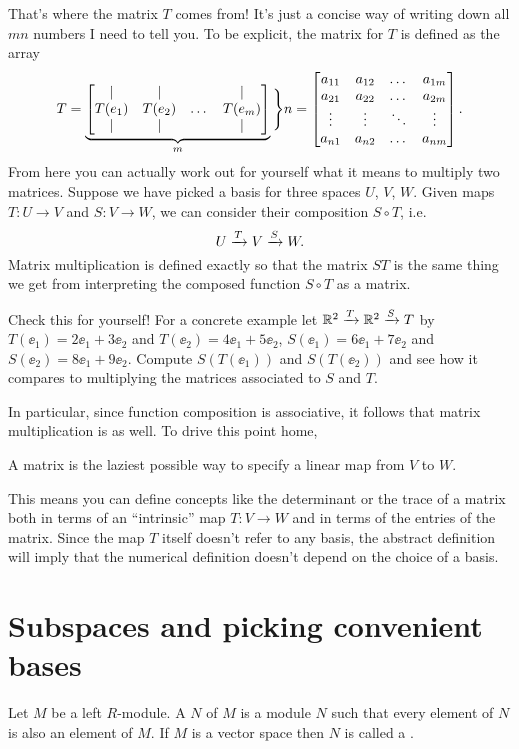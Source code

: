 That's where the matrix $T$ comes from!
It's just a concise way of writing down all $mn$ numbers I need to tell you.
To be explicit, the matrix for $T$ is defined as the array
\[ T =  \underbrace{%
	\begin{bmatrix}
		\mid & \mid & & \mid \\	
		T(e_1) & T(e_2) & \dots & T(e_{m}) \\
		\mid & \mid & & \mid \\	
	\end{bmatrix}
	}_m \Bigg\} n
	=
	\begin{bmatrix}
		a_{11} & a_{12} & \dots & a_{1m} \\
		a_{21} & a_{22} & \dots & a_{2m} \\
		\vdots & \vdots & \ddots & \vdots \\
		a_{n1} & a_{n2} & \dots & a_{nm}
	\end{bmatrix}.
	\]
From here you can actually work out for yourself what it means to multiply two matrices.
Suppose we have picked a basis for three spaces $U$, $V$, $W$.
Given maps $T : U \to V$ and $S : V \to W$, we can consider their composition $S \circ T$, i.e.
\[ U \xrightarrow{T} V \xrightarrow{S} W. \]
Matrix multiplication is defined exactly so that the matrix $ST$
is the same thing we get from interpreting the composed function $S \circ T$ as a matrix.
\begin{exercise}
	Check this for yourself!
	For a concrete example let $\mathbb R^2 \xrightarrow{T} \mathbb R^2 \xrightarrow{S} T$
	by $T(\ee_1) = 2\ee_1+3\ee_2$ and $T(\ee_2) = 4\ee_1+5\ee_2$,
	$S(\ee_1) = 6\ee_1+7\ee_2$ and $S(\ee_2) = 8\ee_1+9\ee_2$.
	Compute $S(T(\ee_1))$ and $S(T(\ee_2))$ and see how it compares
	to multiplying the matrices associated to $S$ and $T$.
\end{exercise}
In particular, since function composition is associative,
it follows that matrix multiplication is as well.
To drive this point home,
\begin{moral}
	A matrix is the laziest possible way to specify
	a linear map from $V$ to $W$.
\end{moral}

This means you can define concepts like the determinant or the trace of a matrix
both in terms of an ``intrinsic'' map $T : V \to W$ and in terms of the entries of the matrix.
Since the map $T$ itself doesn't refer to any basis,
the abstract definition will imply that the numerical definition doesn't depend on the choice of a basis.
\section{Subspaces and picking convenient bases}
\begin{definition}
	Let $M$ be a left $R$-module. 
	A  $N$ of $M$ is a module $N$
	such that every element of $N$ is also an element of $M$.
	If $M$ is a vector space then $N$ is called a .
\end{definition}

